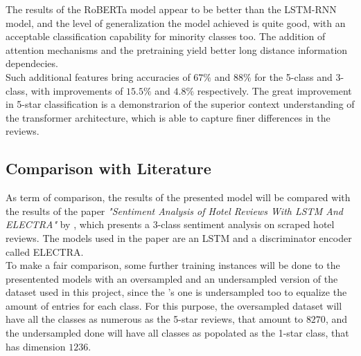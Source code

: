            The results of the RoBERTa model appear to be better than the LSTM-RNN model, 
            and the level of generalization the model achieved is quite good, with an 
            acceptable classification capability for minority classes too. The addition of 
            attention mechanisms and the pretraining yield better long distance information
            dependecies.\\
            
            Such additional features bring accuracies of $67\%$ and $88\%$ for the 5-class 
            and 3-class, with improvements of $15.5\%$ and $4.8\%$ respectively. The great 
            improvement in 5-star classification is a demonstrarion of the superior context
            understanding of the transformer architecture, which is able to capture finer
            differences in the reviews. \\

        \subsection{Comparison with Literature}
        \label{subsec:comparison_literature}
            As term of comparison, the results of the presented model will be 
            compared with the results of the paper \textit{"Sentiment Analysis of 
            Hotel Reviews With LSTM And ELECTRA"} by \cite{husein2023sentiment}, 
            which presents a 3-class sentiment analysis on scraped hotel reviews.
            The models used in the paper are an LSTM and a discriminator encoder
            called ELECTRA.\\

            To make a fair comparison, some further training instances will be done to the 
            presentented models with an oversampled and an undersampled version
            of the dataset used in this project, since the \citet{husein2023sentiment}'s
            one is undersampled too to equalize the amount of entries for each class. For 
            this purpose, the oversampled dataset will have all the classes as numerous as 
            the 5-star reviews, that amount to $8270$, and the undersampled done will have 
            all classes as popolated as the 1-star class, that has dimension $1236$.\\

